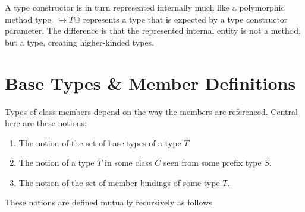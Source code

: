 A type constructor is in turn represented internally much like a polymorphic method type. \lstinline@[$\pm a_1$ >: $L_1$ <: $U_1 \commadots \pm a_n$ >: $L_n$ <: $U_n$] $\mapsto T$@ represents a type that is expected by a type constructor parameter. The difference is that the represented internal entity is not a method, but a type, creating higher-kinded types. 






\section{Base Types \& Member Definitions}
\label{sec:base-types}
\label{sec:member-definitions}

Types of class members depend on the way the members are referenced. Central here are these notions:
\begin{enumerate}
\item The notion of the set of base types of a type $T$.
\item The notion of a type $T$ in some class $C$ seen from some prefix type $S$.
\item The notion of the set of member bindings of some type $T$. 
\end{enumerate}

These notions are defined mutually recursively as follows. 

